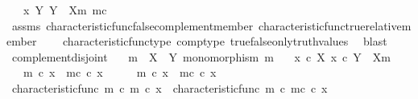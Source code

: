 \begin{isabellebody}
\ \ \ {\isachardoublequoteopen}x\ {\isasymin}\isactrlbsub Y\isactrlesub \ {\isacharparenleft}{\kern0pt}Y\ {\isasymsetminus}\ {\isacharparenleft}{\kern0pt}X{\isacharcomma}{\kern0pt}m{\isacharparenright}{\kern0pt}{\isacharcomma}{\kern0pt}\ m\isactrlsup c{\isacharparenright}{\kern0pt}{\isachardoublequoteclose}\isanewline
%
\isadelimproof
\ \ %
\endisadelimproof
%
\isatagproof
{}\isamarkupfalse%
\ assms\ characteristic{\isacharunderscore}{\kern0pt}func{\isacharunderscore}{\kern0pt}false{\isacharunderscore}{\kern0pt}complement{\isacharunderscore}{\kern0pt}member\ characteristic{\isacharunderscore}{\kern0pt}func{\isacharunderscore}{\kern0pt}true{\isacharunderscore}{\kern0pt}relative{\isacharunderscore}{\kern0pt}member\isanewline
\ \ \ \ characteristic{\isacharunderscore}{\kern0pt}func{\isacharunderscore}{\kern0pt}type\ comp{\isacharunderscore}{\kern0pt}type\ true{\isacharunderscore}{\kern0pt}false{\isacharunderscore}{\kern0pt}only{\isacharunderscore}{\kern0pt}truth{\isacharunderscore}{\kern0pt}values\ \isamarkupfalse%
\ blast%
\endisatagproof
{\isafoldproof}%
%
\isadelimproof
\isanewline
%
\endisadelimproof
\isanewline
{}\isamarkupfalse%
\ complement{\isacharunderscore}{\kern0pt}disjoint{\isacharcolon}{\kern0pt}\isanewline
\ \ \ {\isachardoublequoteopen}m\ {\isacharcolon}{\kern0pt}\ X\ {\isasymrightarrow}\ Y{\isachardoublequoteclose}\ {\isachardoublequoteopen}monomorphism\ m{\isachardoublequoteclose}\isanewline
\ \ \ {\isachardoublequoteopen}x\ {\isasymin}\isactrlsub c\ X{\isachardoublequoteclose}\ {\isachardoublequoteopen}x{\isacharprime}{\kern0pt}\ {\isasymin}\isactrlsub c\ Y\ {\isasymsetminus}\ {\isacharparenleft}{\kern0pt}X{\isacharcomma}{\kern0pt}m{\isacharparenright}{\kern0pt}{\isachardoublequoteclose}\isanewline
\ \ \ {\isachardoublequoteopen}m\ {\isasymcirc}\isactrlsub c\ x\ {\isasymnoteq}\ m\isactrlsup c\ {\isasymcirc}\isactrlsub c\ x{\isacharprime}{\kern0pt}{\isachardoublequoteclose}\isanewline
%
\isadelimproof
%
\endisadelimproof
%
\isatagproof
{}\isamarkupfalse%
\ \isanewline
\ \ \isamarkupfalse%
\ {\isachardoublequoteopen}m\ {\isasymcirc}\isactrlsub c\ x\ {\isacharequal}{\kern0pt}\ m\isactrlsup c\ {\isasymcirc}\isactrlsub c\ x{\isacharprime}{\kern0pt}{\isachardoublequoteclose}\isanewline
\ \ \isamarkupfalse%
\ \isamarkupfalse%
\ {\isachardoublequoteopen}characteristic{\isacharunderscore}{\kern0pt}func\ m\ {\isasymcirc}\isactrlsub c\ m\ {\isasymcirc}\isactrlsub c\ x\ {\isacharequal}{\kern0pt}\ characteristic{\isacharunderscore}{\kern0pt}func\ m\ {\isasymcirc}\isactrlsub c\ m\isactrlsup c\ {\isasymcirc}\isactrlsub c\ x{\isacharprime}{\kern0pt}{\isachardoublequoteclose}\isanewline

\end{isabellebody}
